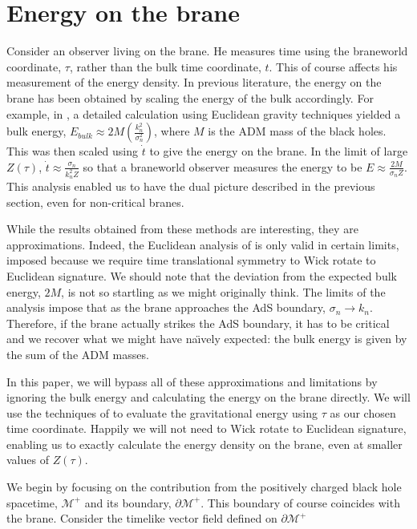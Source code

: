 \documentclass[a4paper,12pt]{article}
\begin{document}
\section{Energy on the brane}

Consider an observer living on the brane. He measures time using the
braneworld coordinate, $\tau$, rather than the bulk time coordinate,
$t$. This of course affects his measurement of the energy density. In
previous literature, the energy on the brane has been obtained by
scaling the energy of the bulk accordingly. For example, in
\cite{Padilla:CFT}, a detailed calculation using Euclidean gravity
techniques yielded a bulk energy, $E_{bulk} \approx
2M\left(\frac{k_n^2}{\sigma_n^2}\right)$, where $M$ is the ADM mass of
the black holes. This was then scaled using $\dot{t}$ to give the
energy on the brane. In the limit of large $Z(\tau)$, $\dot{t} \approx
\frac{\sigma_n}{k_n^2Z}$ so that a braneworld observer measures the
energy to be $E \approx \frac{2M}{\sigma_n Z}$. This analysis enabled
us to have the dual picture described in the previous section, even
for non-critical branes.

While the results obtained from these methods are interesting, they
are approximations. Indeed, the Euclidean analysis of
\cite{Padilla:CFT} is only valid in certain limits, imposed because we
require time translational symmetry to Wick rotate to Euclidean
signature. We should note that the deviation from the expected bulk
energy, $2M$, is not so startling as we might originally think. The
limits of the analysis impose that as the brane approaches the AdS
boundary, $\sigma_n \to k_n$. Therefore, if the brane actually strikes
the AdS boundary, it has to be critical and we recover what we might
have na\"\i vely expected: the bulk energy is given by the sum of the
ADM masses.

In this paper, we will bypass all of these approximations and
limitations by ignoring the bulk energy and calculating the energy on
the brane directly. We will use the techniques of
\cite{Hawking:hamiltonian} to evaluate the gravitational energy using
$\tau$ as our chosen time coordinate. Happily we will not need to Wick
rotate to Euclidean signature, enabling us to exactly calculate the
energy density on the brane, even at smaller values of $Z(\tau)$.

We begin by focusing on the contribution from the positively charged
black hole spacetime, $\mathcal{M}^+$ and its boundary,
$\partial\mathcal{M}^+$.  This boundary of course coincides with the
brane. Consider the timelike vector field defined on $\partial
\mathcal{M}^+$
\end{document}
